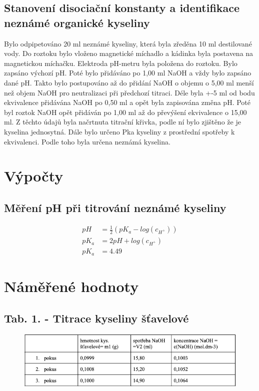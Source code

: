 \documentclass[13pt, a4paper, twoside]{article}
\begin{document}
    \subsection*{Stanovení disociační konstanty a identifikace neznámé organické kyseliny}
    Bylo odpipetováno 20 ml neznámé kyseliny, která byla zředěna 10 ml destilované vody. Do roztoku bylo vloženo magnetické míchadlo a kádinka byla postavena na magnetickou míchačku. Elektroda pH-metru byla položena do roztoku. Bylo zapsáno výchozí pH. Poté bylo přidáváno po 1,00 ml NaOH a vždy bylo zapsáno dané pH. Takto bylo postupováno až do přidání NaOH o objemu o 5,00 ml menší než objem NaOH pro neutralizaci při předchozí titraci. Déle byla +-5 ml od bodu ekvivalence přidávána NaOH po 0,50 ml a opět byla zapisována změna pH. Poté byl roztok NaOH opět přidáván po 1,00 ml až do převýšení ekvivalence o 15,00 ml. Z těchto údajů byla načrtnuta titrační křivka, podle ní bylo zjištěno že je kyselina jednosytná. Dále bylo určeno Pka kyseliny z prostřední spotřeby k ekvivalenci. Podle toho byla určena neznámá kyselina.
    
    \section*{Výpočty}
    \subsection*{Měření pH při titrování neznámé kyseliny}
    \begin{align*}
    pH &= \frac{1}{2}(pK_a - log(c_{H^+}))\\
    pK_a &= 2pH + log(c_{H^+})\\
    pK_a &= 4.49
    \end{align*}
    \section*{Náměřené hodnoty}
    \subsection*{Tab. 1. - Titrace kyseliny šťavelové}
    \begin{figure}[H]
        \centering
        \includegraphics[width=7in]{kys_stav.png} 
    \end{figure}
\end{document}
